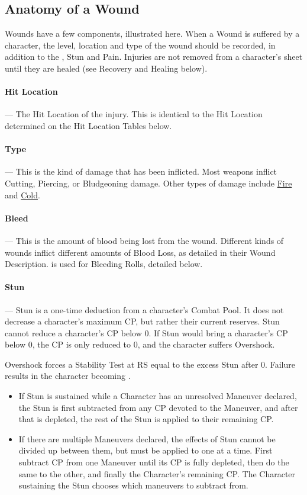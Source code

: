 \documentclass[oneside,11pt,english]{book}
\begin{document}
\subsection{Anatomy of a Wound}
Wounds have a few components, illustrated here. When a Wound is suffered by a character, the level, location and type of the wound should be recorded, in addition to the , Stun and Pain. 
Injuries are not removed from a character’s sheet until they are healed (see Recovery and Healing below).

\paragraph{Hit Location}---\quad
The Hit Location of the injury. This is identical to the Hit Location determined on the Hit Location Tables below.

\paragraph{Type}---\quad
This is the kind of damage that has been inflicted. Most weapons inflict Cutting, Piercing, or Bludgeoning damage. Other types of damage include \hyperref[wound:Burn Damage]{Fire} and \hyperref[wound:Cold Damage]{Cold}.
\paragraph{Bleed\label{par:Bleed}}---\quad
This is the amount of blood being lost from the wound. Different kinds of wounds inflict different amounts of Blood Loss, as detailed in their Wound Description.  is used for Bleeding Rolls, detailed below. 

\paragraph{Stun\label{par:Stun}}---\quad
Stun is a one-time deduction from a character's Combat Pool. It does not decrease a character's maximum CP, but rather their current reserves. Stun cannot reduce a character's CP below 0. If Stun would bring a character's CP below 0, the CP is only reduced to 0, and the character suffers Overshock.

\label{par:Overshock}Overshock forces a Stability Test at RS equal to the excess Stun after 0. Failure results in the character becoming . %

\begin{itemize}
\item If Stun is sustained while a Character has an unresolved Maneuver declared, the Stun is first 
subtracted from any CP devoted to the Maneuver, and after that is depleted, the rest of the Stun is 
applied to their remaining CP. 
\item If there are multiple Maneuvers declared, the effects of Stun cannot be divided up between them, 
but must be applied to one at a time. First subtract CP from one Maneuver until its CP is fully 
depleted, then do the same to the other, and finally the Character’s remaining CP. The Character 
sustaining the Stun chooses which maneuvers to subtract from. 
\end{itemize}
\end{document}
